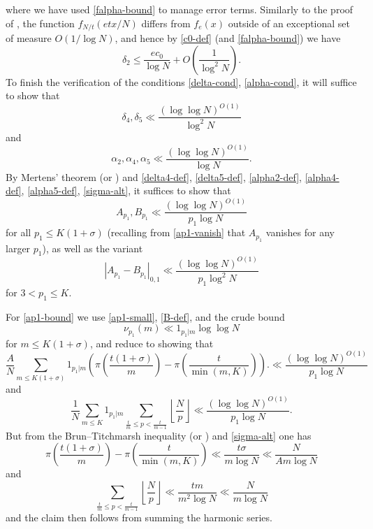 \documentclass[10pt,a4paper,reqno]{amsart}
\numberwithin{equation}{section}
\theoremstyle{plain}
\theoremstyle{definition}
\begin{document}
where we have used \eqref{falpha-bound} to manage error terms.
Similarly to the proof of , the function $f_{N/t}(etx/N)$ differs from $f_e(x)$ outside of an exceptional set of measure $O(1/\log N)$, and hence by \eqref{c0-def} (and \eqref{falpha-bound}) we have
$$ \delta_2 \leq \frac{ec_0}{\log N} + O\left( \frac{1}{\log^2 N} \right).$$
To finish the verification of the conditions \eqref{delta-cond}, \eqref{alpha-cond}, it will suffice to show that
\begin{equation}\label{delta-remaining}
\delta_4, \delta_5 \ll \frac{(\log\log N)^{O(1)}}{\log^2 N}
\end{equation}
and
\begin{equation}\label{alpha-remaining}
\alpha_2, \alpha_4, \alpha_5 \ll \frac{(\log\log N)^{O(1)}}{\log N}.
\end{equation}
By Mertens' theorem (or ) and \eqref{delta4-def}, \eqref{delta5-def}, \eqref{alpha2-def}, \eqref{alpha4-def}, \eqref{alpha5-def}, \eqref{sigma-alt}, it suffices to show that
\begin{equation}\label{ap1-bound}
A_{p_1}, B_{p_1} \ll \frac{(\log\log N)^{O(1)}}{p_1 \log N} 
\end{equation}
for all $p_1 \leq K(1+\sigma)$ (recalling from \eqref{ap1-vanish} that $A_{p_1}$ vanishes for any larger $p_1$), as well as the variant
\begin{equation}\label{ap1-diff}
  |A_{p_1}-B_{p_1}|_{0,1} \ll \frac{(\log\log N)^{O(1)}}{p_1 \log^2 N}
\end{equation}
for $3 < p_1 \leq K$.

For \eqref{ap1-bound} we use \eqref{ap1-small}, \eqref{B-def}, and the crude bound 
\begin{equation}\label{crude}
  \nu_{p_1}(m) \ll 1_{p_1|m} \log\log N
\end{equation}
 for $m \leq K(1+\sigma)$, and reduce to showing that
$$ \frac{A}{N} \sum_{m \leq K(1+\sigma)} 1_{p_1|m} \left( \pi\left(\frac{t(1+\sigma)}{m}\right) - \pi\left(\frac{t}{\min(m,K)} \right) \right).
\ll \frac{(\log\log N)^{O(1)}}{p_1 \log N}$$
and
$$ \frac{1}{N} \sum_{m \leq K} 1_{p_1|m} \sum_{\frac{t}{m} \leq p < \frac{t}{m-1}} \left \lfloor \frac{N}{p} \right\rfloor \ll
\frac{(\log\log N)^{O(1)}}{p_1 \log N}.$$ 
But from the Brun--Titchmarsh inequality (or ) and \eqref{sigma-alt} one has
$$ \pi\left(\frac{t(1+\sigma)}{m}\right) - \pi\left(\frac{t}{\min(m,K)}\right) \ll \frac{t\sigma}{m \log N} \ll \frac{N}{Am \log N}$$
and
$$ \sum_{\frac{t}{m} \leq p < \frac{t}{m-1}} \left \lfloor \frac{N}{p} \right\rfloor \ll \frac{tm}{m^2 \log N} \ll \frac{N}{m \log N}$$
and the claim then follows from summing the harmonic series.
\end{document}
